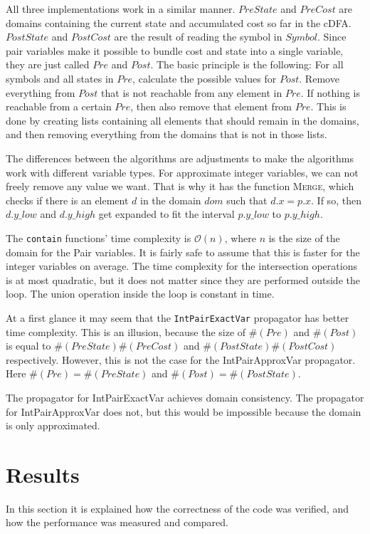 \documentclass[a4paper,11pt]{article}
\begin{document}
All three implementations work in a similar manner. $PreState$ and $PreCost$ are domains containing the current state and accumulated cost so far in the cDFA. $PostState$ and $PostCost$ are the result of reading the symbol in $Symbol$. Since pair variables make it possible to bundle cost and state into a single variable, they are just called $Pre$ and $Post$. The basic principle is the following: For all symbols and all states in $Pre$, calculate the possible values for $Post$. Remove everything from $Post$ that is not reachable from any element in $Pre$. If nothing is reachable from a certain $Pre$, then also remove that element from $Pre$. This is done by creating lists containing all elements that should remain in the domains, and then removing everything from the domains that is not in those lists.



The differences between the algorithms are adjustments to make the algorithms work with different variable types. For approximate integer variables, we can not freely remove any value we want. That is why it has the function \textsc{Merge}, which checks if there is an element $d$ in the domain $dom$ such that $d.x=p.x$. If so, then $d.y\_low$ and $d.y\_high$ get expanded to fit the interval $p.y\_low$ to $p.y\_high$. 

The \texttt{contain} functions' time complexity is $\mathcal{O}(n)$, where $n$ is the size of the domain for the Pair variables. It is fairly safe to assume that this is faster for the integer variables on average. The time complexity for the intersection operations is at most quadratic, but it does not matter since they are performed outside the loop. The union operation inside the loop is constant in time.

At a first glance it may seem that the \texttt{IntPairExactVar} propagator has better time complexity. This is an illusion, because the size of $\#(Pre)$ and $\#(Post)$ is equal to $\#(PreState)\#(PreCost)$ and $\#(PostState)\#(PostCost)$ respectively. However, this is not the case for the IntPairApproxVar propagator. Here $\#(Pre)=\#(PreState)$ and $\#(Post)=\#(PostState)$. 

The propagator for IntPairExactVar achieves domain consistency. The propagator for IntPairApproxVar does not, but this would be impossible because the domain is only approximated.

\section{Results}
In this section it is explained how the correctness of the code was verified, and how the performance was measured and compared.
\end{document}
